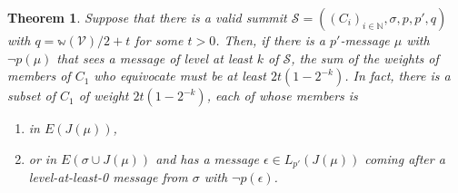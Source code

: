 \documentclass[12pt]{article}
\newtheorem{theorem}{Theorem}
\begin{document}
\begin{theorem}
  Suppose that there is a valid summit $\mathcal{S}=((C_i)_{i \in \mathbb{N}}, \sigma, p, p', q)$ with $q=\mathbb{w}(\mathcal{V})/2+t$ for some $t>0$. Then, if there is a $p'$-message $\mu$ with $\neg p(\mu)$ that sees a message of level at least $k$ of $\mathcal{S}$, the sum of the weights of members of $C_1$ who equivocate must be at least $2t(1-2^{-k})$. In fact, there is a subset of $C_1$ of weight $2t(1 - 2^{-k})$, each of whose members is
  \begin{enumerate}
    \item \label{seen-equivocation} in $E(J(\mu))$,
    \item \label{contradictory-equivocation} or in $E(\sigma \cup J(\mu))$ and has a message $\epsilon \in L_{p'}(J(\mu))$ coming after a level-at-least-0 message from $\sigma$ with $\neg p(\epsilon)$.
  \end{enumerate}
\end{theorem}
\end{document}
